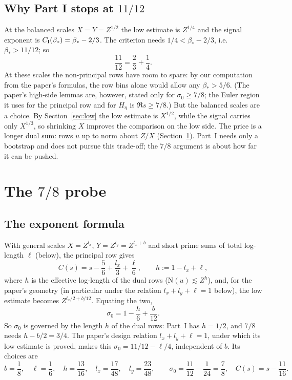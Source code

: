 \documentclass[11pt]{article}
\newcommand{\N}{\mathrm N}
\begin{document}
\subsection{Why Part I stops at \texorpdfstring{$11/12$}{11/12}}
At the balanced scales $X=Y=Z^{1/2}$ the low estimate is $Z^{1/4}$ and the signal exponent is $C_{\rm I}(\beta_*)=\beta_*-2/3$. The criterion needs
$1/4<\beta_*-2/3$, i.e.\ $\beta_*>11/12$; so
\[
 \frac{11}{12}=\frac23+\frac14 .
\]
At these scales the non-principal rows have room to spare: by our computation from the paper's
formulas, the row bins alone would allow any $\beta_*>5/6$. (The paper's high-side lemmas are,
however, stated only for $\sigma_0\ge7/8$; the Euler region it uses for the principal row and for
$H_\eta$ is $\Re s\ge7/8$.) But the balanced scales are a choice. By Section~\ref{sec:low} the low
estimate is $X^{1/2}$, while the signal carries only $X^{1/3}$, so shrinking $X$ improves the
comparison on the low side. The price is a longer dual sum: rows $u$ up to norm about $Z/X$
(Section~\ref{sec:78probe}). Part~I needs only a bootstrap and does not pursue this trade-off; the
$7/8$ argument is about how far it can be pushed.

\section{The \texorpdfstring{$7/8$}{7/8} probe}\label{sec:78probe}

\subsection{The exponent formula}
With general scales $X=Z^{l_x}$, $Y=Z^{l_y}=Z^{l_x+b}$ and short prime
sums of total log-length $\ell$ (below), the principal row gives
\cite[Def.\ def:stage-high-data]{OAI78}
\[
 C(s)=s-\frac56+\frac{l_x}3+\frac\ell6,
 \qquad h:=1-l_x+\ell,
\]
where $h$ is the effective log-length of the dual rows ($\N(u)\lesssim Z^h$),
and, for the paper's geometry (in particular under the relation $l_x+l_y+\ell=1$ below), the
low estimate becomes $Z^{l_x/2+b/12}$. Equating the two,
\[
 \sigma_0=1-\frac h6+\frac b{12}.
\]
So $\sigma_0$ is governed by the length $h$ of the dual rows: Part~I has $h=1/2$, and $7/8$
needs $h-b/2=3/4$. The paper's design relation $l_x+l_y+\ell=1$, under which its low estimate is
proved, makes this $\sigma_0=11/12-\ell/4$, independent of $b$. Its choices are
\begin{equation}\label{eq:geometry}
 b=\frac18,\quad \ell=\frac16,\quad h=\frac{13}{16},\quad
 l_x=\frac{17}{48},\quad l_y=\frac{23}{48},\qquad
 \sigma_0=\frac{11}{12}-\frac1{24}=\frac78,\quad C(s)=s-\frac{11}{16}.
\end{equation}
\end{document}
